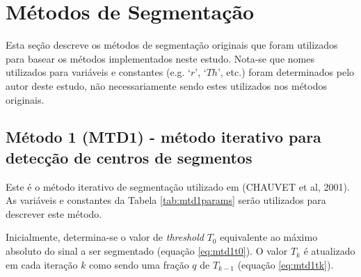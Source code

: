\documentclass[
	12pt,				%
	openright,			%
	oneside,
	a4paper,			%
	english,			%
	francais,			%
	spanish,			%
	brazil				%
	]{abntex2}
\begin{document}
\section{Métodos de Segmentação}

	Esta seção descreve os métodos de segmentação originais que foram utilizados para basear os métodos implementados neste estudo. Nota-se que nomes utilizados para variáveis e constantes (e.g. `$r$', `$Th$', etc.) foram determinados pelo autor deste estudo, não necessariamente sendo estes utilizados nos métodos originais.
	
\subsection{Método 1 (MTD1) - método iterativo para detecção de centros de segmentos}

	Este é o método iterativo de segmentação utilizado em (CHAUVET et al, 2001). As variáveis e constantes da Tabela \ref{tab:mtd1params} serão utilizados para descrever este método.
	
\begin{table}[htb]
\end{table}
	
	Inicialmente, determina-se o valor de \emph{threshold} $T_0$ equivalente ao máximo absoluto do sinal a ser segmentado (equação \ref{eq:mtd1t0}). O valor $T_k$ é atualizado em cada iteração $k$ como sendo uma fração $q$ de $T_{k-1}$ (equação \ref{eq:mtd1tk}).
	
\end{document}
